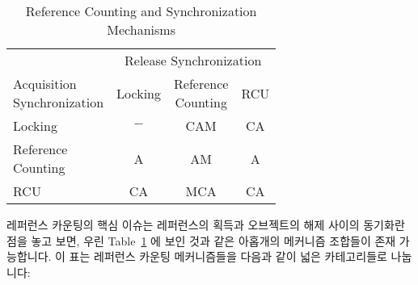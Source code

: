 \begin{table}[tb]
\renewcommand*{\arraystretch}{1.25}
\small
\centering
\begin{tabular}{lccc}
	\toprule
	& \multicolumn{3}{c}{Release Synchronization} \\
	\cmidrule(l){2-4}
	\parbox[c]{.8in}{Acquisition\\Synchronization}
			& Locking
				& \parbox[c]{.5in}{Reference\\Counting}
				        & RCU \\
	 \cmidrule(l){2-4}
	Locking		& $-$	  & CAM	      & CA  \\
	\parbox[c][6ex]{.8in}{Reference\\Counting}
			& A	  & AM        & A   \\
	RCU		& CA	  & MCA	      & CA  \\
	\bottomrule
\end{tabular}
\caption{Reference Counting and Synchronization Mechanisms}
\label{tab:together:Reference Counting and Synchronization Mechanisms}
\end{table}

레퍼런스 카운팅의 핵심 이슈는 레퍼런스의 획득과 오브젝트의 해제 사이의 동기화란
점을 놓고 보면, 우린
Table~\ref{tab:together:Reference Counting and Synchronization Mechanisms} 에
보인 것과 같은 아홉개의 메커니즘 조합들이 존재 가능합니다.
이 표는 레퍼런스 카운팅 메커니즘들을 다음과 같이 넓은 카테고리들로 나눕니다:
\iffalse

